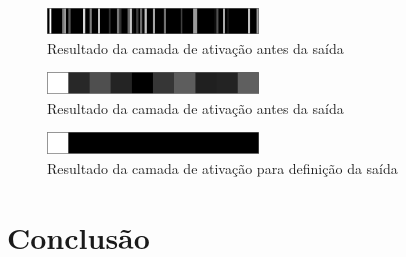 \documentclass[
	12pt,				%
	oneside,			%
	a4paper,			%
	english,			%
	french,				%
	spanish,			%
	brazil,				%
	]{abntex2}
\begin{document}
\begin{center}
\begin{figure}
	\centering
	\includegraphics[width=0.5\textwidth]{images/fabio/resultados/network_1/input_1_layer_activation_7}
	\caption{Resultado da camada de ativação antes da saída}
	\label{fig:input1atv5}
\end{figure}
\end{center}
\begin{center}
\begin{figure}
	\centering
	\includegraphics[width=0.5\textwidth]{images/fabio/resultados/network_1/input_1_layer_dense_2}
	\caption{Resultado da camada de ativação antes da saída}
	\label{fig:input1dense2}
\end{figure}
\end{center}
\begin{center}
\begin{figure}
	\centering
	\includegraphics[width=0.5\textwidth]{images/fabio/resultados/network_1/input_1_layer_activation_8}
	\caption{Resultado da camada de ativação para definição da saída}
	\label{fig:input1atv7}
\end{figure}
\end{center}
\chapter{Conclusão}

\par \lipsum[30-30]





%
%
\end{document}
